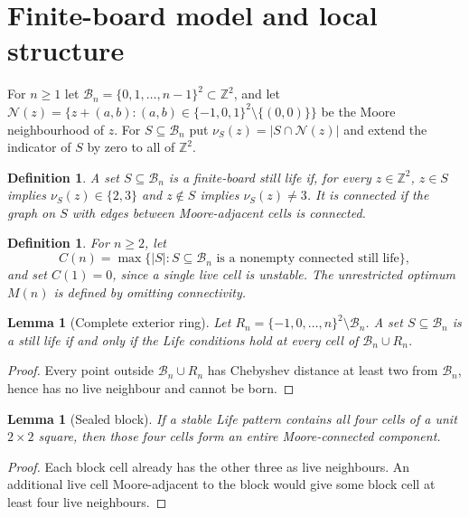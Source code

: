 \documentclass[10pt]{article}
\newtheorem{lemma}[theorem]{Lemma}
\newtheorem{definition}[theorem]{Definition}
\theoremstyle{remark}
\newcommand{\B}{\mathcal B}
\newcommand{\N}{\mathcal N}
\begin{document}
\section{Finite-board model and local structure}\label{sec:model}

For $n\ge1$ let $\B_n=\{0,1,\ldots,n-1\}^2\subset\mathbb Z^2$, and let
$\N(z)=\{z+(a,b):(a,b)\in\{-1,0,1\}^2\setminus\{(0,0)\}\}$ be the Moore
neighbourhood of $z$.  For $S\subseteq\B_n$ put $\nu_S(z)=|S\cap\N(z)|$ and
extend the indicator of $S$ by zero to all of $\mathbb Z^2$.

\begin{definition}\label{def:still-life}
A set $S\subseteq\B_n$ is a \emph{finite-board still life} if, for every
$z\in\mathbb Z^2$, $z\in S$ implies $\nu_S(z)\in\{2,3\}$ and $z\notin S$
implies $\nu_S(z)\ne3$.  It is \emph{connected} if the graph on $S$ with edges
between Moore-adjacent cells is connected.
\end{definition}

\begin{definition}\label{def:Cn}
For $n\ge2$, let
\[
 C(n)=\max\{|S|:S\subseteq\B_n\text{ is a nonempty connected still life}\},
\]
and set $C(1)=0$, since a single live cell is unstable.  The unrestricted
optimum $M(n)$ is defined by omitting connectivity.
\end{definition}

\begin{lemma}[Complete exterior ring]\label{lem:ring}
Let $R_n=\{-1,0,\ldots,n\}^2\setminus\B_n$.  A set $S\subseteq\B_n$ is a still
life if and only if the Life conditions hold at every cell of $\B_n\cup R_n$.
\end{lemma}

\begin{proof}
Every point outside $\B_n\cup R_n$ has Chebyshev distance at least two from
$\B_n$, hence has no live neighbour and cannot be born.
\end{proof}

\begin{lemma}[Sealed block]\label{lem:sealed-block}
If a stable Life pattern contains all four cells of a unit $2\times2$ square,
then those four cells form an entire Moore-connected component.
\end{lemma}

\begin{proof}
Each block cell already has the other three as live neighbours.  An additional
live cell Moore-adjacent to the block would give some block cell at least four
live neighbours.
\end{proof}
\end{document}
